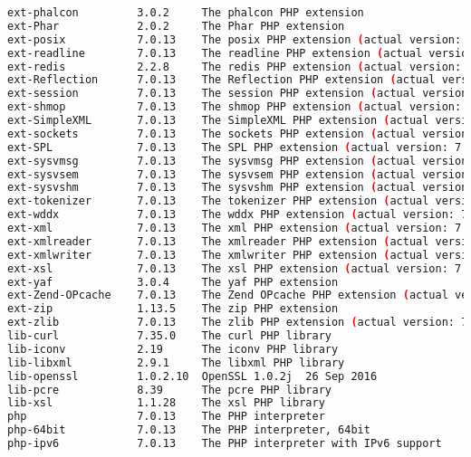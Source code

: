 \begin{lstlisting}[language=bash]
ext-phalcon         3.0.2     The phalcon PHP extension
ext-Phar            2.0.2     The Phar PHP extension
ext-posix           7.0.13    The posix PHP extension (actual version: 7.0.13-1+deb.sury.org~trusty+1)
ext-readline        7.0.13    The readline PHP extension (actual version: 7.0.13-1+deb.sury.org~trusty+1)
ext-redis           2.2.8     The redis PHP extension (actual version: 2.2.8-devphp7)
ext-Reflection      7.0.13    The Reflection PHP extension (actual version: 7.0.13-1+deb.sury.org~trusty+1)
ext-session         7.0.13    The session PHP extension (actual version: 7.0.13-1+deb.sury.org~trusty+1)
ext-shmop           7.0.13    The shmop PHP extension (actual version: 7.0.13-1+deb.sury.org~trusty+1)
ext-SimpleXML       7.0.13    The SimpleXML PHP extension (actual version: 7.0.13-1+deb.sury.org~trusty+1)
ext-sockets         7.0.13    The sockets PHP extension (actual version: 7.0.13-1+deb.sury.org~trusty+1)
ext-SPL             7.0.13    The SPL PHP extension (actual version: 7.0.13-1+deb.sury.org~trusty+1)
ext-sysvmsg         7.0.13    The sysvmsg PHP extension (actual version: 7.0.13-1+deb.sury.org~trusty+1)
ext-sysvsem         7.0.13    The sysvsem PHP extension (actual version: 7.0.13-1+deb.sury.org~trusty+1)
ext-sysvshm         7.0.13    The sysvshm PHP extension (actual version: 7.0.13-1+deb.sury.org~trusty+1)
ext-tokenizer       7.0.13    The tokenizer PHP extension (actual version: 7.0.13-1+deb.sury.org~trusty+1)
ext-wddx            7.0.13    The wddx PHP extension (actual version: 7.0.13-1+deb.sury.org~trusty+1)
ext-xml             7.0.13    The xml PHP extension (actual version: 7.0.13-1+deb.sury.org~trusty+1)
ext-xmlreader       7.0.13    The xmlreader PHP extension (actual version: 7.0.13-1+deb.sury.org~trusty+1)
ext-xmlwriter       7.0.13    The xmlwriter PHP extension (actual version: 7.0.13-1+deb.sury.org~trusty+1)
ext-xsl             7.0.13    The xsl PHP extension (actual version: 7.0.13-1+deb.sury.org~trusty+1)
ext-yaf             3.0.4     The yaf PHP extension
ext-Zend-OPcache    7.0.13    The Zend OPcache PHP extension (actual version: 7.0.13-1+deb.sury.org~trusty+1)
ext-zip             1.13.5    The zip PHP extension
ext-zlib            7.0.13    The zlib PHP extension (actual version: 7.0.13-1+deb.sury.org~trusty+1)
lib-curl            7.35.0    The curl PHP library
lib-iconv           2.19      The iconv PHP library
lib-libxml          2.9.1     The libxml PHP library
lib-openssl         1.0.2.10  OpenSSL 1.0.2j  26 Sep 2016
lib-pcre            8.39      The pcre PHP library
lib-xsl             1.1.28    The xsl PHP library
php                 7.0.13    The PHP interpreter
php-64bit           7.0.13    The PHP interpreter, 64bit
php-ipv6            7.0.13    The PHP interpreter with IPv6 support
\end{lstlisting}


